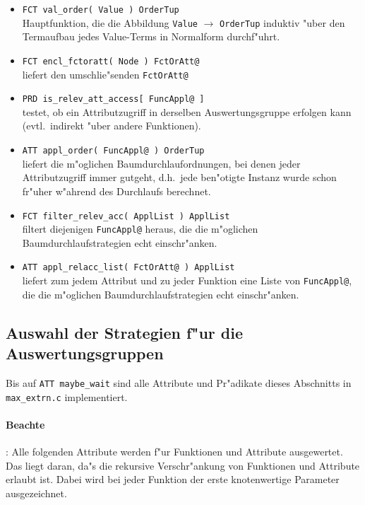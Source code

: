 \begin{itemize}
\item {\tt FCT val\_order( Value ) OrderTup}\\
Hauptfunktion, die die Abbildung {\tt Value} $\to$ {\tt OrderTup} induktiv
"uber den Termaufbau jedes Value-Terms in Normalform durchf"uhrt.

\item {\tt FCT encl\_fctoratt( Node ) FctOrAtt@}\\
liefert den umschlie"senden {\tt FctOrAtt@}

\item {\tt PRD is\_relev\_att\_access[ FuncAppl@ ]}\\
testet, ob ein Attributzugriff in derselben Auswertungsgruppe
erfolgen kann (evtl.\ indirekt "uber andere Funktionen).


\item {\tt ATT appl\_order( FuncAppl@ ) OrderTup}\\
liefert die m"oglichen Baumdurchlaufordnungen, bei denen jeder Attributzugriff
immer gutgeht, d.h.\ jede ben"otigte Instanz wurde schon fr"uher w"ahrend
des Durchlaufs berechnet.

\item {\tt FCT filter\_relev\_acc( ApplList ) ApplList}\\
filtert diejenigen {\tt FuncAppl@} heraus, die die m"oglichen
Baumdurchlaufstrategien echt einschr"anken.

\item {\tt ATT appl\_relacc\_list( FctOrAtt@ ) ApplList}\\
liefert zum jedem Attribut und zu jeder Funktion eine Liste von {\tt FuncAppl@},
die die m"oglichen Baumdurchlaufstrategien echt einschr"anken.
\end{itemize}




\subsection{Auswahl der Strategien f"ur die Auswertungsgruppen}

Bis auf {\tt ATT maybe\_wait} sind alle Attribute und Pr"adikate
dieses Abschnitts in {\tt max\_extrn.c} implementiert.

\paragraph{Beachte}: Alle folgenden Attribute werden f"ur Funktionen und Attribute
ausgewertet. Das liegt daran, da"s die rekursive Verschr"ankung von Funktionen
und Attribute erlaubt ist. Dabei wird bei jeder Funktion der erste knotenwertige
Parameter ausgezeichnet.

